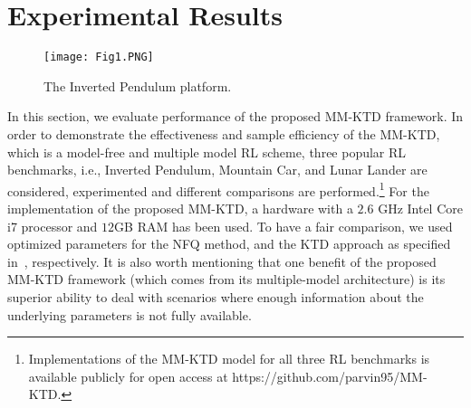 \documentclass{ieeeaccess}
\def\MMK{\text{MM-KTD}}
\begin{document}
\section{Experimental Results}  \label{sec:Sim}
\begin{figure}[t!]
\centering
\texttt{[image: Fig1.PNG]}
\caption{\small The Inverted Pendulum platform.}\label{Fig:1}
\end{figure}
In this section, we evaluate performance of the proposed $\MMK$ framework.
In order to demonstrate the effectiveness and sample efficiency of the $\MMK$, which is a model-free and multiple model RL scheme,
three popular RL benchmarks, i.e., Inverted Pendulum, Mountain Car, and Lunar Lander are considered, experimented and different comparisons are performed.\footnote{Implementations of the MM-KTD model for all three RL benchmarks is available publicly for open access at https://github.com/parvin95/MM-KTD.} 
For the implementation of the proposed MM-KTD, a hardware with a $2.6$ GHz Intel Core i7 processor and $12$GB  RAM has been used. 
To have a fair comparison, we used optimized parameters for the NFQ method, and the KTD approach as specified in~\cite{6, 23}, respectively. It is also worth mentioning that one benefit of the proposed MM-KTD framework (which comes from its multiple-model architecture) is its superior ability to deal with scenarios where enough information about the underlying parameters is not fully available. 

\end{document}
